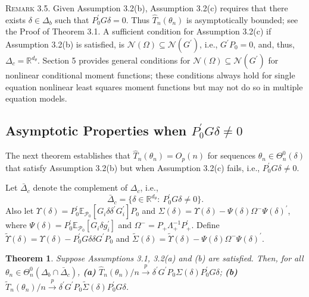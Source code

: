 \documentclass[hidelinks, 11 pt, a4paper, pdflatex]{article}
\newtheorem{theorem}{Theorem}[section]
\begin{document}
{    \textsc{Remark 3.5}. Given Assumption 3.2(b), Assumption 3.2(c) requires that there exists $\delta \in \Delta_b$ such that 
     $P_{0}^{\prime}G\delta = 0$. Thus $\hat{T}_{n}(\theta_{n})$ is asymptotically bounded; see the Proof of Theorem 3.1. A sufficient condition for Assumption 3.2(c) if Assumption 3.2(b) is satisfied, is $\mathcal{N}(\Omega) \subseteq \mathcal{N}(G^{\prime})$, i.e., $G^{\prime}P_{0} = 0$, and, thus, $\Delta_{c} = \mathbb{R}^{d_{\theta}}$. Section 5 provides general conditions for $\mathcal{N}(\Omega) \subseteq \mathcal{N}(G^{\prime})$ for nonlinear conditional moment functions; these conditions always hold for single equation nonlinear least squares moment functions but may not do so in multiple equation models.


  \subsection{Asymptotic Properties when $P_{0}^{\prime}G \delta \neq 0$}

   The next theorem establishes that $\hat{T}_{n}(\theta _{n}) = O_p(n)$ for sequences $\theta_{n} \in \Theta_n^{0}(\delta)$ that satisfy Assumption 3.2(b) but when Assumption 3.2(c) fails, i.e., $P_0^{\prime}G\delta \neq 0$.

   Let $\bar{\Delta}_{c}$ denote the complement of $\Delta_{c}$, i.e.,
    \[
     \bar{\Delta}_{c} = \{\delta \in \mathbb{R}^{d_{\theta}}:~P_{0}^{\prime}G\delta \neq 0\}.
    \]
   Also let $\Upsilon(\delta) = P_{0}^{\prime}\mathbb{E}_{\mathcal{P}_0}[G_i \delta \delta^{\prime}G_i^{\prime}]P_0$ and $\Sigma(\delta)= \Upsilon(\delta) - \Psi(\delta) \Omega^{-} \Psi(\delta)^{\prime}$, where $\Psi(\delta) = P_{0}^{\prime}\mathbb{E}_{\mathcal{P}_0}[G_i \delta g_i^{\prime}]$ and $\Omega^{-} = P_{+}\Lambda_+^{-1}P_+^{\prime}$. Define $\tilde{\Upsilon}(\delta) = \Upsilon(\delta) -  P_{0}^{\prime}G \delta \delta G^{\prime}P_0$ and $\tilde{\Sigma}(\delta) = \tilde{\Upsilon}(\delta) - \Psi(\delta) \Omega^{-} \Psi(\delta)^{\prime}$.
    \begin{theorem}
     Suppose Assumptions 3.1, 3.2(a) and (b) are satisfied. Then, for all $\theta _{n} \in \Theta_{n}^{0}(\Delta_{b} \cap \bar{\Delta}_{c})$,
      \textbf{(a)} $\hat{T}_{n}(\theta_{n})/n
                     \overset{p}{\rightarrow }
                     \delta^{\prime}G^{\prime}P_{0} \Sigma(\delta) P_{0}^{\prime}G\delta $;
      \textbf{(b)} $\tilde{T}_{n}(\theta_{n})/n
                     \overset{p}{\rightarrow }
                     \delta^{\prime}G^{\prime }P_{0} \tilde{\Sigma}(\delta) P_{0}^{\prime }G\delta $.
    \end{theorem}

}
\end{document}
